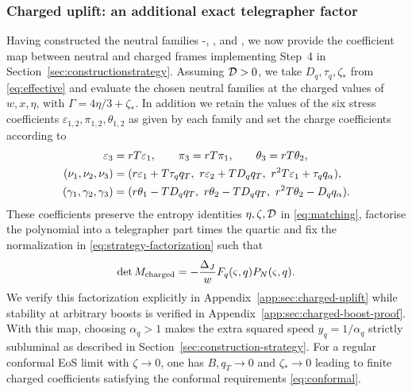 \subsubsection{Charged uplift: an additional exact telegrapher factor}
\label{sec:charged-factorization-overview}
Having constructed the neutral families -, ,  and , we now
provide the coefficient map between neutral and charged frames implementing Step~4 in Section~\ref{sec:constructionstrategy}. Assuming $\mathcal D>0$, we take
$D_q,\tau_q,\zeta_*$ from \eqref{eq:effective} and evaluate the chosen
neutral families at the charged values of $w,x,\eta$, with
$\Gamma=4\eta/3+\zeta_*$. In addition we retain the values of the six stress coefficients
$\varepsilon_{1,2},\pi_{1,2},\theta_{1,2}$ as given by each family and set the charge coefficients according to
\begin{align}
 \eps_3&=rT\eps_1,\qquad \pi_3=rT\pi_1,\qquad
 \theta_3=rT\theta_2,\label{eq:uplift-stress}\\
 (\nu_1,\nu_2,\nu_3)&=
 (r\varepsilon_1+T\tau_qq_T,\ r\varepsilon_2+TD_qq_T,\ r^2T\varepsilon_1+\tau_qq_\alpha),\nonumber\\
 (\gamma_1,\gamma_2,\gamma_3)&=
 (r\theta_1-TD_qq_T,\ r\theta_2-TD_qq_T,\ r^2T\theta_2-D_qq_\alpha).
 \label{eq:uplift-current}
\end{align}
These coefficients preserve the entropy identities $\eta,\zeta,\mathcal D$ in
\eqref{eq:matching}, factorise the polynomial into a telegrapher part times the quartic
and fix the normalization in \eqref{eq:strategy-factorization} such that
\begin{equation}\label{eq:factorization}
 \det M_{\rm charged}=-\frac{\Delta_J}{w}F_q(\varsigma,q)P_N(\varsigma,q).
\end{equation}
We verify this factorization explicitly  in
Appendix~\ref{app:sec:charged-uplift} while stability at arbitrary boosts is verified in Appendix~\ref{app:sec:charged-boost-proof}.  With this map, choosing $\alpha_q>1$ makes
the extra squared speed $y_q=1/\alpha_q$ strictly subluminal as described in
Section~\ref{sec:construction-strategy}. For a regular conformal EoS limit with $\zeta\to0$, one has
$B,q_T\to0$ and $\zeta_*\to0$ leading to finite charged coefficients satisfying the conformal requirements \eqref{eq:conformal}.

